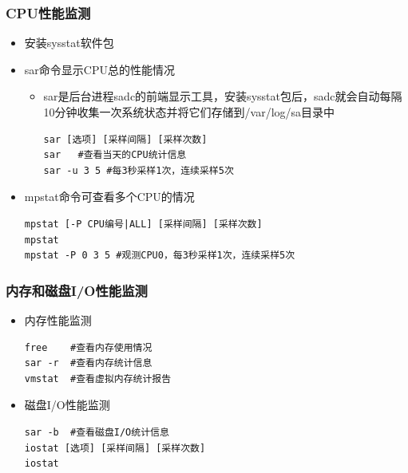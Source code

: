 \documentclass[xcolor=svgnames,presentation]{beamer}
\begin{document}
\begin{frame}[fragile]
\frametitle{CPU性能监测}
\label{sec-5-2}
\begin{itemize}

\item 安装sysstat软件包
\label{sec-5-2-1}%

\item sar命令显示CPU总的性能情况
\label{sec-5-2-2}%
\begin{itemize}

\item sar是后台进程sadc的前端显示工具，安装sysstat包后，sadc就会自动每隔10分钟收集一次系统状态并将它们存储到/var/log/sa目录中\\
\label{sec-5-2-2-1}%
\begin{verbatim}
sar [选项] [采样间隔] [采样次数]
sar   #查看当天的CPU统计信息
sar -u 3 5 #每3秒采样1次，连续采样5次
\end{verbatim}
\end{itemize} %

\item mpstat命令可查看多个CPU的情况\\
\label{sec-5-2-3}%
\begin{verbatim}
mpstat [-P CPU编号|ALL] [采样间隔] [采样次数]
mpstat
mpstat -P 0 3 5 #观测CPU0，每3秒采样1次，连续采样5次
\end{verbatim}
\end{itemize} %
\end{frame}
\begin{frame}[fragile]
\frametitle{内存和磁盘I/O性能监测}
\label{sec-5-3}
\begin{itemize}

\item 内存性能监测\\
\label{sec-5-3-1}%
\begin{verbatim}
free    #查看内存使用情况
sar -r  #查看内存统计信息
vmstat  #查看虚拟内存统计报告
\end{verbatim}

\item 磁盘I/O性能监测\\
\label{sec-5-3-2}%
\begin{verbatim}
sar -b  #查看磁盘I/O统计信息
iostat [选项] [采样间隔] [采样次数]
iostat
\end{verbatim}
\end{itemize} %
\end{frame}
\end{document}
